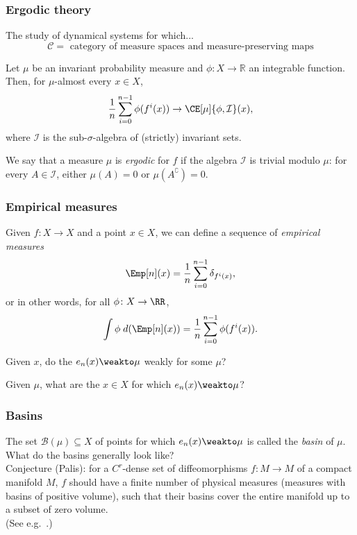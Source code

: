 \documentclass[shortlabels, 9pt, aspectratio=2013]{beamer}
\begin{document}
\begin{frame}
  \frametitle{Ergodic theory}
  The study of dynamical systems for which...
  \[\mathcal{C} = \text{ category of measure spaces and measure-preserving maps}\]
  \begin{theorem}\label{thm:birkhoff}
    Let  \(\mu\) be an invariant probability measure and \(\phi \colon X \to \mathbb{R}\) an integrable function. Then, for \(\mu\)-almost every \(x \in X\),
    \begin{equation}\label{eq:birkhoff}
      \frac{1}{n}\sum_{i = 0}^{n - 1} \phi (f^i(x)) \to \CE[\mu]{\phi, \mathcal{I}}(x),
    \end{equation}
    where \(\mathcal{I}\) is the sub-\(\sigma\)-algebra of (strictly) invariant sets.
  \end{theorem}
  \begin{definition}
    We say that a measure \(\mu\) is \emph{ergodic} for \(f\) if the algebra \(\mathcal{I}\) is trivial modulo \(\mu\): for every \(A \in \mathcal{I}\), either \(\mu(A) = 0\) or \(\mu(A^{\complement}) = 0\).
  \end{definition}
\end{frame}

\begin{frame}
  \frametitle{Empirical measures}
  Given \(f \colon X \to X\) and a point \(x \in X\), we can define a sequence of \emph{empirical measures}
  \[\Emp[n](x) = \frac{1}{n} \sum_{i = 0}^{n - 1} \delta_{f^i(x)},\]
  or in other words, for all \(\phi \colon X \to \RR\),
  \begin{equation*}
    \int \phi \;d(\Emp[n](x)) = \frac{1}{n}\sum_{i = 0}^{n - 1} \phi(f^i(x)).
  \end{equation*}
  \begin{question}
    Given \(x\), do the \(e_n(x) \weakto \mu\) weakly for some \(\mu\)?
  \end{question}
  \begin{question}
    Given \(\mu\), what are the \(x \in X\) for which \(e_n(x) \weakto \mu\)?
  \end{question}
\end{frame}

\begin{frame}
  \frametitle{Basins}
  The set \(\mathcal{B}(\mu) \subseteq X\) of points for which \(e_n(x) \weakto \mu\) is called the \emph{basin} of \(\mu\).\\[2em]

  What do the basins generally look like?\\[2em]

  Conjecture (Palis): for a \(C^r\)-dense set of diffeomorphisms \(f \colon M \to M\) of a compact manifold \(M\), \(f\) should have a finite number of physical measures (measures with basins of positive volume), such that their basins cover the entire manifold up to a subset of zero volume.\\[1em]

  (See e.g.\ .)
\end{frame}
\end{document}
